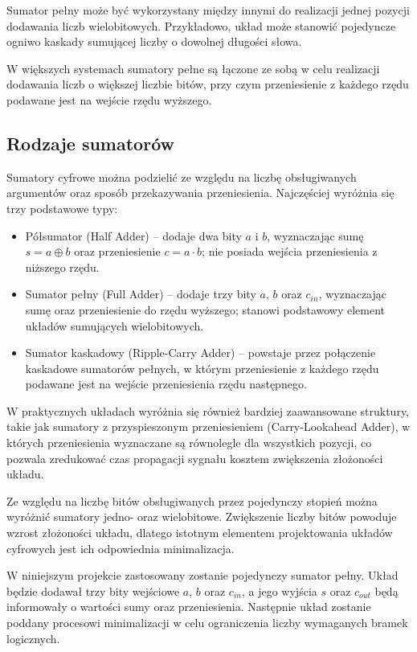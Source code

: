Sumator pełny może być wykorzystany między innymi do realizacji jednej pozycji dodawania liczb wielobitowych. Przykładowo, układ może stanowić pojedyncze ogniwo kaskady sumującej liczby o dowolnej długości słowa.

W większych systemach sumatory pełne są łączone ze sobą w celu realizacji dodawania liczb o większej liczbie bitów, przy czym przeniesienie z każdego rzędu podawane jest na wejście rzędu wyższego.

\subsection{Rodzaje sumatorów}

Sumatory cyfrowe można podzielić ze względu na liczbę obsługiwanych argumentów oraz sposób przekazywania przeniesienia. Najczęściej wyróżnia się trzy podstawowe typy:
\begin{itemize}
    \item Półsumator (Half Adder) -- dodaje dwa bity $a$ i $b$, wyznaczając sumę $s = a \oplus b$ oraz przeniesienie $c = a \cdot b$; nie posiada wejścia przeniesienia z niższego rzędu.
    \item Sumator pełny (Full Adder) -- dodaje trzy bity $a$, $b$ oraz $c_{in}$, wyznaczając sumę oraz przeniesienie do rzędu wyższego; stanowi podstawowy element układów sumujących wielobitowych.
    \item Sumator kaskadowy (Ripple-Carry Adder) -- powstaje przez połączenie kaskadowe sumatorów pełnych, w którym przeniesienie z każdego rzędu podawane jest na wejście przeniesienia rzędu następnego.
\end{itemize}

W praktycznych układach wyróżnia się również bardziej zaawansowane struktury, takie jak sumatory z przyspieszonym przeniesieniem (Carry-Lookahead Adder), w których przeniesienia wyznaczane są równolegle dla wszystkich pozycji, co pozwala zredukować czas propagacji sygnału kosztem zwiększenia złożoności układu.

Ze względu na liczbę bitów obsługiwanych przez pojedynczy stopień można wyróżnić sumatory jedno- oraz wielobitowe. Zwiększenie liczby bitów powoduje wzrost złożoności układu, dlatego istotnym elementem projektowania układów cyfrowych jest ich odpowiednia minimalizacja.

W niniejszym projekcie zastosowany zostanie pojedynczy sumator pełny. Układ będzie dodawał trzy bity wejściowe $a$, $b$ oraz $c_{in}$, a jego wyjścia $s$ oraz $c_{out}$ będą informowały o wartości sumy oraz przeniesienia. Następnie układ zostanie poddany procesowi minimalizacji w celu ograniczenia liczby wymaganych bramek logicznych.
